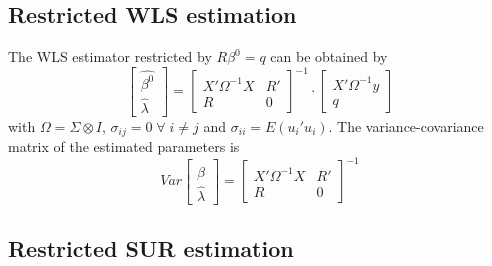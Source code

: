 \subsection{Restricted WLS estimation}

The WLS estimator restricted by $R \beta^0 = q$ can be obtained by
\begin{equation}
   \left[ \begin{array}{c}
      \widehat{\beta^0} \\ \widehat{\lambda}
   \end{array} \right]
   =
   \left[ \begin{array}{cc}
      X' \Omega^{-1} X & R' \\ 
      R & 0
   \end{array} \right]^{-1}
   \cdot
   \left[ \begin{array}{c}
      X' \Omega^{-1} y \\ q 
   \end{array} \right]
\end{equation}
with $\Omega = \Sigma \otimes I$, 
$\sigma_{ij} = 0 \; \forall \; i \neq j$ and
$\sigma_{ii} = E \left( u_i' u_i \right)$.
The variance-covariance matrix of the estimated parameters is
\begin{equation}
   Var 
   \left[ \begin{array}{c}
      \widehat{\beta} \\ \widehat{\lambda}
   \end{array} \right] 
   = 
   \left[ \begin{array}{cc}
      X' \Omega^{-1} X & R' \\ 
      R & 0
   \end{array} \right]^{-1}
\end{equation}

\subsection{Restricted SUR estimation}

